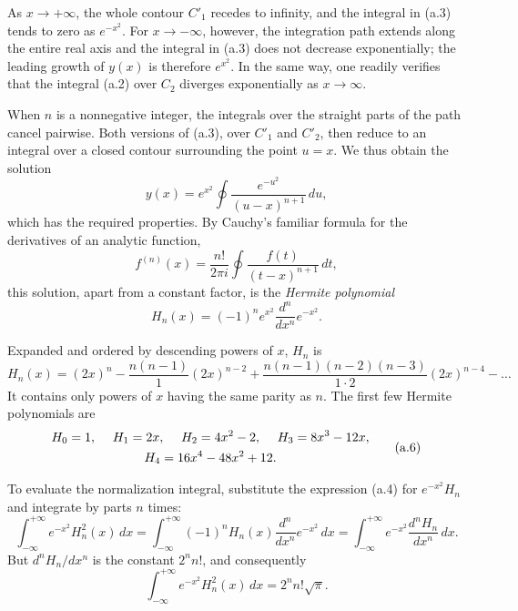 As $x\to+\infty$, the whole contour $C'_1$ recedes to infinity, and the
integral in (a.3) tends to zero as $e^{-x^2}$. For $x\to-\infty$, however, the
integration path extends along the entire real axis and the integral in (a.3)
does not decrease exponentially; the leading growth of $y(x)$ is therefore
$e^{x^2}$. In the same way, one readily verifies that the integral (a.2) over
$C_2$ diverges exponentially as $x\to\infty$.

When $n$ is a nonnegative integer, the integrals over the straight parts of
the path cancel pairwise. Both versions of (a.3), over $C'_1$ and $C'_2$, then
reduce to an integral over a closed contour surrounding
the point $u=x$. We thus obtain the solution
\[
 y(x)=e^{x^2}\oint\frac{e^{-u^2}}{(u-x)^{n+1}}\,du,
\]
which has the required properties. By Cauchy's familiar formula for the
derivatives of an analytic function,
\[
 f^{(n)}(x)=\frac{n!}{2\pi i}\oint\frac{f(t)}{(t-x)^{n+1}}\,dt,
\]
this solution, apart from a constant factor, is the \emph{Hermite polynomial}
\begin{equation}
 H_n(x)=(-1)^ne^{x^2}\frac{d^n}{dx^n}e^{-x^2}.
 \tag{a.4}
\end{equation}

Expanded and ordered by descending powers of $x$, $H_n$ is
\begin{equation}
 H_n(x)=(2x)^n-\frac{n(n-1)}{1}(2x)^{n-2}
 +\frac{n(n-1)(n-2)(n-3)}{1\cdot2}(2x)^{n-4}-\ldots
 \tag{a.5}
\end{equation}
It contains only powers of $x$ having the same parity as $n$. The first few
Hermite polynomials are
\begin{equation}
 \begin{gathered}
 H_0=1,\hspace{1.25em} H_1=2x,\hspace{1.25em}
 H_2=4x^2-2,\hspace{1.25em} H_3=8x^3-12x,\\
 H_4=16x^4-48x^2+12.
 \end{gathered}
 \tag{a.6}
\end{equation}

To evaluate the normalization integral, substitute the expression (a.4) for
$e^{-x^2}H_n$ and integrate by parts $n$ times:
\[
 \int_{-\infty}^{+\infty}e^{-x^2}H_n^2(x)\,dx
 =\int_{-\infty}^{+\infty}(-1)^nH_n(x)
 \frac{d^n}{dx^n}e^{-x^2}\,dx
 =\int_{-\infty}^{+\infty}e^{-x^2}\frac{d^nH_n}{dx^n}\,dx.
\]
But $d^nH_n/dx^n$ is the constant $2^nn!$, and consequently
\begin{equation}
 \int_{-\infty}^{+\infty}e^{-x^2}H_n^2(x)\,dx=2^nn!\sqrt\pi.
 \tag{a.7}
\end{equation}
